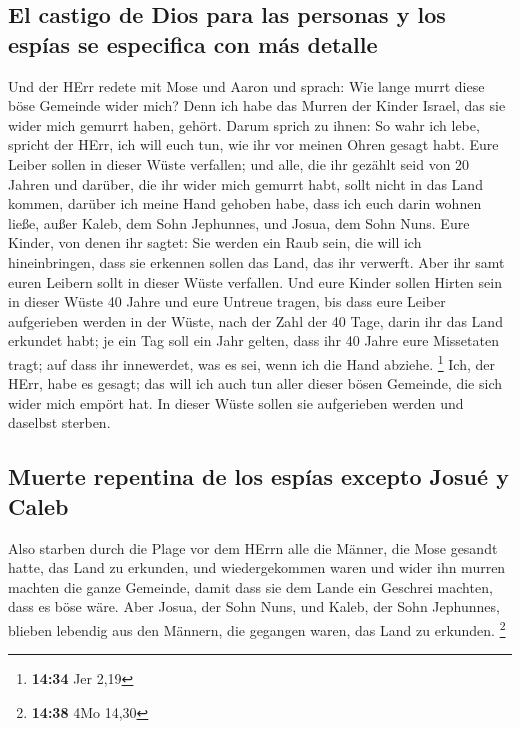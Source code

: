 \hypertarget{el-castigo-de-dios-para-las-personas-y-los-espuxedas-se-especifica-con-muxe1s-detalle}{%
\subsection{El castigo de Dios para las personas y los espías se
especifica con más
detalle}\label{el-castigo-de-dios-para-las-personas-y-los-espuxedas-se-especifica-con-muxe1s-detalle}}

 Und der HErr redete mit Mose und Aaron und sprach:
 Wie lange murrt diese böse Gemeinde wider mich? Denn ich
habe das Murren der Kinder Israel, das sie wider mich gemurrt haben,
gehört.  Darum sprich zu ihnen: So wahr ich lebe, spricht
der HErr, ich will euch tun, wie ihr vor meinen Ohren gesagt habt.
 Eure Leiber sollen in dieser Wüste verfallen; und alle,
die ihr gezählt seid von 20 Jahren und darüber, die ihr wider mich
gemurrt habt,  sollt nicht in das Land kommen, darüber
ich meine Hand gehoben habe, dass ich euch darin wohnen ließe, außer
Kaleb, dem Sohn Jephunnes, und Josua, dem Sohn Nuns. 
Eure Kinder, von denen ihr sagtet: Sie werden ein Raub sein, die will
ich hineinbringen, dass sie erkennen sollen das Land, das ihr verwerft.
 Aber ihr samt euren Leibern sollt in dieser Wüste
verfallen.  Und eure Kinder sollen Hirten sein in dieser
Wüste 40 Jahre und eure Untreue tragen, bis dass eure Leiber aufgerieben
werden in der Wüste,  nach der Zahl der 40 Tage, darin
ihr das Land erkundet habt; je ein Tag soll ein Jahr gelten, dass ihr 40
Jahre eure Missetaten tragt; auf dass ihr innewerdet, was es sei, wenn
ich die Hand abziehe. \footnote{\textbf{14:34} Jer 2,19} 
Ich, der HErr, habe es gesagt; das will ich auch tun aller dieser bösen
Gemeinde, die sich wider mich empört hat. In dieser Wüste sollen sie
aufgerieben werden und daselbst sterben.

\hypertarget{muerte-repentina-de-los-espuxedas-excepto-josuuxe9-y-caleb}{%
\subsection{Muerte repentina de los espías excepto Josué y
Caleb}\label{muerte-repentina-de-los-espuxedas-excepto-josuuxe9-y-caleb}}

 Also starben durch die Plage vor dem HErrn alle die
Männer, die Mose gesandt hatte, das Land zu erkunden, und wiedergekommen
waren und wider ihn murren machten die ganze Gemeinde, 
damit dass sie dem Lande ein Geschrei machten, dass es böse wäre.
 Aber Josua, der Sohn Nuns, und Kaleb, der Sohn
Jephunnes, blieben lebendig aus den Männern, die gegangen waren, das
Land zu erkunden. \footnote{\textbf{14:38} 4Mo 14,30}

